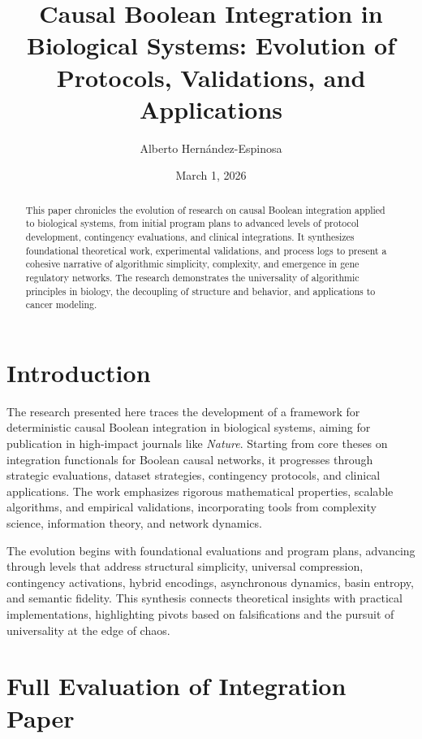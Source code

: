 \documentclass{article}
\title{Causal Boolean Integration in Biological Systems: Evolution of Protocols, Validations, and Applications}
\author{Alberto Hern\'andez-Espinosa}
\date{March 1, 2026}
\begin{document}
\maketitle

\begin{abstract}
This paper chronicles the evolution of research on causal Boolean integration applied to biological systems, from initial program plans to advanced levels of protocol development, contingency evaluations, and clinical integrations. It synthesizes foundational theoretical work, experimental validations, and process logs to present a cohesive narrative of algorithmic simplicity, complexity, and emergence in gene regulatory networks. The research demonstrates the universality of algorithmic principles in biology, the decoupling of structure and behavior, and applications to cancer modeling.
\end{abstract}

\section{Introduction}
The research presented here traces the development of a framework for deterministic causal Boolean integration in biological systems, aiming for publication in high-impact journals like \textit{Nature}. Starting from core theses on integration functionals for Boolean causal networks, it progresses through strategic evaluations, dataset strategies, contingency protocols, and clinical applications. The work emphasizes rigorous mathematical properties, scalable algorithms, and empirical validations, incorporating tools from complexity science, information theory, and network dynamics.

The evolution begins with foundational evaluations and program plans, advancing through levels that address structural simplicity, universal compression, contingency activations, hybrid encodings, asynchronous dynamics, basin entropy, and semantic fidelity. This synthesis connects theoretical insights with practical implementations, highlighting pivots based on falsifications and the pursuit of universality at the edge of chaos.

\section{Full Evaluation of Integration Paper}
\end{document}
